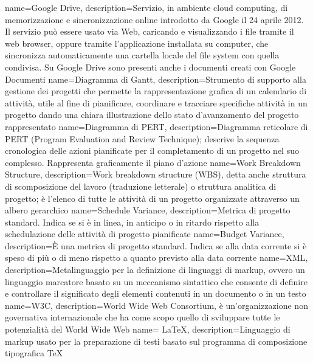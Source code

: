  {
	name=Google Drive,
	description={Servizio, in ambiente cloud computing, di memorizzazione e sincronizzazione online introdotto da Google il 24 aprile 2012. Il servizio può essere usato via Web, caricando e visualizzando i file tramite il web browser, oppure tramite l'applicazione installata su computer, che sincronizza automaticamente una cartella locale del file system con quella condivisa. Su Google Drive sono presenti anche i documenti creati con Google Documenti}
}
 {
	name=Diagramma di Gantt,
	description={Strumento di supporto alla gestione dei progetti che permette la rappresentazione
	grafica di un calendario di attività, utile al fine di pianificare, coordinare e tracciare
	specifiche attività in un progetto dando una chiara illustrazione dello stato d'avanzamento
	del progetto rappresentato}
}
 {
	name=Diagramma di PERT,
	description={Diagramma reticolare di PERT (Program Evaluation and Review Technique); descrive
	la sequenza cronologica delle azioni pianificate per il completamento di un progetto nel suo
	complesso. Rappresenta graficamente il piano d'azione}
}
 {
	name=Work Breakdown Structure,
	description={Work breakdown structure (WBS), detta anche struttura di scomposizione del lavoro (traduzione letterale) o struttura analitica di progetto; è l'elenco di tutte le attività di un progetto organizzate attraverso un albero gerarchico}
}
 {
	name=Schedule Variance,
	description={Metrica di progetto standard. Indica se si è in linea, in anticipo o in ritardo rispetto alla schedulazione delle attività di progetto pianificate}
}
 {
	name=Budget Variance,
	description={È una metrica di progetto standard. Indica se alla data corrente si è speso di più o di meno rispetto a quanto previsto alla data corrente}
}
 {
	name=XML,
	description={Metalinguaggio per la definizione di linguaggi di markup, ovvero un linguaggio marcatore basato su un meccanismo sintattico che consente di definire e controllare il significato degli elementi contenuti in un documento o in un testo}
}
 {
	name=W3C,
	description={World Wide Web Consortium, è un'organizzazione non governativa internazionale che ha come scopo quello di sviluppare tutte le potenzialità del World Wide Web}
}
 {
	name= \LaTeX ,
	description={Linguaggio di markup usato per la preparazione di testi basato sul programma di composizione tipografica TeX}
}
